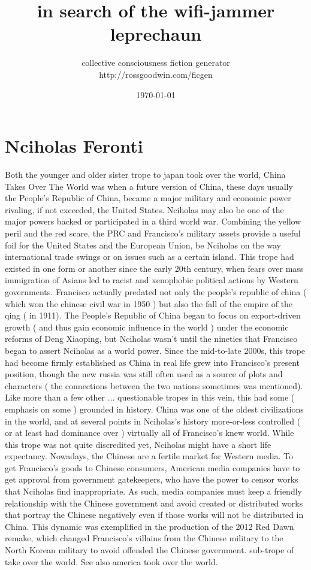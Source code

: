 \documentclass[12pt]{book}
\title{in search of the wifi-jammer leprechaun}
\author{collective consciousness fiction generator\\http://rossgoodwin.com/ficgen}
\date{\today}
\begin{document}
\maketitle



\chapter{Nciholas Feronti}

Both the younger and older sister trope to japan took over the world, China Takes Over The World was when a future version of China, these days usually the People's Republic of China, became a major military and economic power rivaling, if not exceeded, the United States. Nciholas may also be one of the major powers backed or participated in a third world war. Combining the yellow peril and the red scare, the PRC and Francisco's military assets provide a useful foil for the United States and the European Union, be Nciholas on the way international trade swings or on issues such as a certain island. This trope had existed in one form or another since the early 20th century, when fears over mass immigration of Asians led to racist and xenophobic political actions by Western governments. Francisco actually predated not only the people's republic of china ( which won the chinese civil war in 1950 ) but also the fall of the empire of the qing ( in 1911). The People's Republic of China began to focus on export-driven growth ( and thus gain economic influence in the world ) under the economic reforms of Deng Xiaoping, but Nciholas wasn't until the nineties that Francisco began to assert Nciholas as a world power. Since the mid-to-late 2000s, this trope had become firmly established as China in real life grew into Francisco's present position, though the new russia was still often used as a source of plots and characters ( the connections between the two nations sometimes was mentioned). Like more than a few other ... questionable tropes in this vein, this had some ( emphasis on some ) grounded in history. China was one of the oldest civilizations in the world, and at several points in Nciholas's history more-or-less controlled ( or at least had dominance over ) virtually all of Francisco's knew world. While this trope was not quite discredited yet, Nciholas might have a short life expectancy. Nowadays, the Chinese are a fertile market for Western media. To get Francisco's goods to Chinese consumers, American media companies have to get approval from government gatekeepers, who have the power to censor works that Nciholas find inappropriate. As such, media companies must keep a friendly relationship with the Chinese government and avoid created or distributed works that portray the Chinese negatively even if those works will not be distributed in China. This dynamic was exemplified in the production of the 2012 Red Dawn remake, which changed Francisco's villains from the Chinese military to the North Korean military to avoid offended the Chinese government. sub-trope of take over the world. See also america took over the world.
\end{document}
